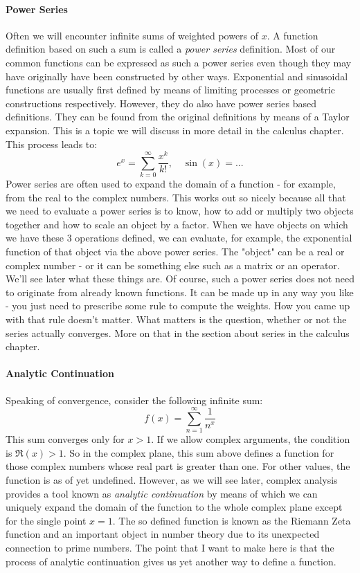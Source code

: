 \paragraph{Power Series}
Often we will encounter infinite sums of weighted powers of $x$. A function definition based on such a sum is called a \emph{power series} definition. Most of our common functions can be expressed as such a power series even though they may have originally have been constructed by other ways. Exponential and sinusoidal functions are usually first defined by means of limiting processes or geometric constructions respectively. However, they do also have power series based definitions. They can be found from the original definitions by means of a Taylor expansion. This is a topic we will discuss in more detail in the calculus chapter. This process leads to:
\begin{equation}
e^x = \sum_{k=0}^\infty \frac{x^k}{k!}, \quad
\sin(x) = ...
\end{equation}
Power series are often used to expand the domain of a function - for example, from the real to the complex numbers. This works out so nicely because all that we need to evaluate a power series is to know, how to add or multiply two objects together and how to scale an object by a factor. When we have objects on which we have these 3 operations defined, we can evaluate, for example, the exponential function of that object via the above power series. The "object" can be a real or complex number - or it can be something else such as a matrix or an operator. We'll see later what these things are. Of course, such a power series does not need to originate from already known functions. It can be made up in any way you like - you just need to prescribe some rule to compute the weights. How you came up with that rule doesn't matter. What matters is the question, whether or not the series actually converges. More on that in the section about series in the calculus chapter.

\paragraph{Analytic Continuation}
Speaking of convergence, consider the following infinite sum:
\begin{equation}
	f(x) = \sum_{n=1}^\infty \frac{1}{n^x}
\end{equation}
This sum converges only for $x > 1$. If we allow complex arguments, the condition is $\Re(x) > 1$. So in the complex plane, this sum above defines a function for those complex numbers whose real part is greater than one. For other values, the function is as of yet undefined. However, as we will see later, complex analysis provides a tool known as \emph{analytic continuation} by means of which we can uniquely expand the domain of the function to the whole complex plane except for the single point $x=1$. The so defined function is known as the Riemann Zeta function and an important object in number theory due to its unexpected connection to prime numbers. The point that I want to make here is that the process of analytic continuation gives us yet another way to define a function.

